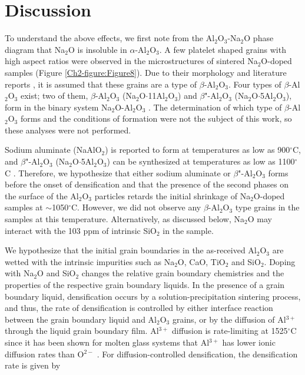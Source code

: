 \section{Discussion}

To understand the above effects, we first note from the Al$_{2}$O$_{3}$-Na$_{2}$O phase diagram \cite{Lambotte2013a} that Na$_{2}$O is insoluble in $\alpha$-Al$_{2}$O$_{3}$. A few platelet shaped grains with high aspect ratios were observed in the microstructures of sintered Na$_{2}$O-doped samples (Figure \ref{Ch2-figure:Figure8}). Due to their morphology and literature reports \cite{Brownmiller1932a,PABLOGALAN1959,Rankin1916,Ridgway1936,Duncan1969a}, it is assumed that these grains are a type of $\beta$-Al$_{2}$O$_{3}$. Four types of $\beta$-Al$_{2}$O$_{3}$ exist; two of them, $\beta$-Al$_{2}$O$_{3}$ (Na$_{2}$O$\cdot$11Al$_{2}$O$_{3}$) and $\beta$"-Al$_{2}$O$_{3}$ (Na$_{2}$O$\cdot$5Al$_{2}$O$_{3}$), form in the binary system Na$_{2}$O-Al$_{2}$O$_{3}$ \cite{Sutorik1998,Stevens1984}. The determination of which type of $\beta$-Al$_{2}$O$_{3}$ forms and the conditions of formation were not the subject of this work, so these analyses were not performed.

Sodium aluminate (NaAlO$_{2}$) is reported to form at temperatures as low as 900$^{\circ}$C,\cite{Christie1978} and $\beta$"-Al$_{2}$O$_{3}$ (Na$_{2}$O$\cdot$5Al$_{2}$O$_{3}$) can be synthesized at temperatures as low as 1100$^{\circ}$C \cite{Brownmiller1932a,Kummer1972a,Vries1969}. Therefore, we hypothesize that either sodium aluminate or $\beta$"-Al$_{2}$O$_{3}$ forms before the onset of densification and that the presence of the second phases on the surface of the Al$_{2}$O$_{3}$ particles retards the initial shrinkage of Na$_{2}$O-doped samples at $\sim$1050$^{\circ}$C.  However, we did not observe any $\beta$-Al$_{2}$O$_{3}$ type grains in the samples at this temperature. Alternatively, as discussed below, Na$_{2}$O may interact with the 103 ppm of intrinsic SiO$_{2}$ in the sample.

We hypothesize that the initial grain boundaries in the as-received Al$_{2}$O$_{3}$ are wetted with the intrinsic impurities such as Na$_{2}$O, CaO, TiO$_{2}$ and SiO$_{2}$. Doping with Na$_{2}$O and SiO$_{2}$ changes the relative grain boundary chemistries and the properties of the respective grain boundary liquids. In the presence of a grain boundary liquid, densification occurs by a solution-precipitation sintering process, and thus, the rate of densification is controlled by either interface reaction between the grain boundary liquid and Al$_{2}$O$_{3}$ grains, or by the diffusion of Al$^{3+}$ through the liquid grain boundary film. Al$^{3+}$ diffusion is rate-limiting at 1525$^{\circ}$C since it has been shown for molten glass systems that Al$^{3+}$ has lower ionic diffusion rates than O$^{2-}$ \cite{Terai1975}. For diffusion-controlled densification, the densification rate is given by \cite{Kwon1990,Kwon1991}

